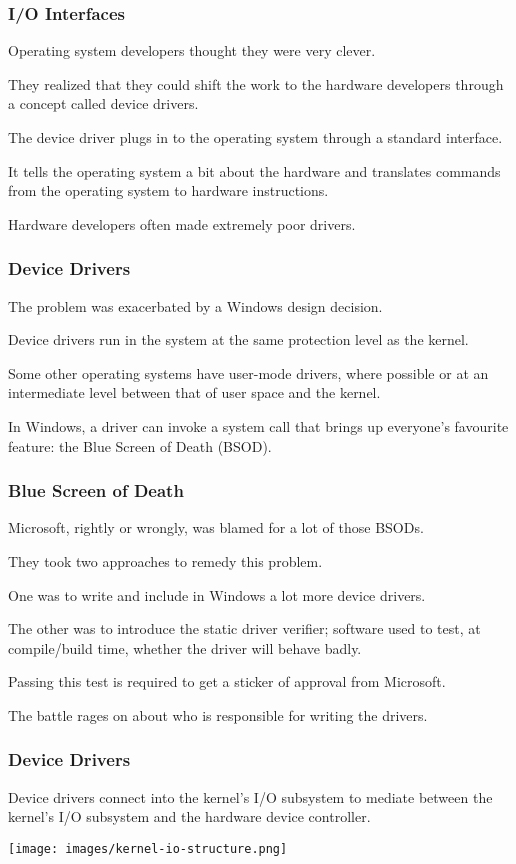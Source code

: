 \begin{frame}
\frametitle{I/O Interfaces}

Operating system developers thought they were very clever. 

They realized that they could shift the work to the hardware developers through a concept called \alert{device drivers}. 

The device driver plugs in to the operating system through a standard interface. 

It tells the operating system a bit about the hardware and translates commands from the operating system to hardware instructions. 

Hardware developers often made extremely poor drivers.

\end{frame}

\begin{frame}
\frametitle{Device Drivers}

The problem was exacerbated by a Windows design decision.

Device drivers run in the system at the same protection level as the kernel. 

Some other operating systems have user-mode drivers, where possible or at an intermediate level between that of user space and the kernel. 

In Windows, a driver can invoke a system call that brings up everyone's favourite feature: the Blue Screen of Death (BSOD).

\end{frame}

\begin{frame}
\frametitle{Blue Screen of Death}

Microsoft, rightly or wrongly, was blamed for a lot of those BSODs. 

They took two approaches to remedy this problem. 

One was to write and include in Windows a lot more device drivers. 

The other was to introduce the static driver verifier; software used to test, at compile/build time, whether the driver will behave badly. 

Passing this test is required to get a sticker of approval from Microsoft.

The battle rages on about who is responsible for writing the drivers.


\end{frame}

\begin{frame}
\frametitle{Device Drivers}

Device drivers connect into the kernel's I/O subsystem to mediate between the kernel's I/O subsystem and the hardware device controller. 

\begin{center}
	\texttt{[image: images/kernel-io-structure.png]}
\end{center}


\end{frame}

